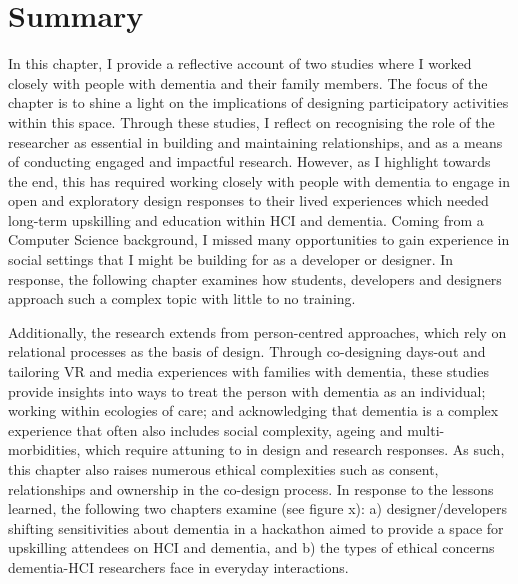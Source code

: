 \section{Summary}
\label{C4:Summary}
In this chapter, I provide a reflective account of two studies where I worked closely with people with dementia and their family members. The focus of the chapter is to shine a light on the implications of designing participatory activities within this space. Through these studies, I reflect on recognising the role of the researcher as essential in building and maintaining relationships, and as a means of conducting engaged and impactful research. However, as I highlight towards the end, this has required working closely with people with dementia to engage in open and exploratory design responses to their lived experiences which needed long-term upskilling and education within HCI and dementia. Coming from a Computer Science background, I missed many opportunities to gain experience in social settings that I might be building for as a developer or designer. In response, the following chapter examines how students, developers and designers approach such a complex topic with little to no training. 

Additionally, the research extends from person-centred approaches, which rely on relational processes as the basis of design. Through co-designing days-out and tailoring VR and media experiences with families with dementia, these studies provide insights into ways to treat the person with dementia as an individual; working within ecologies of care; and acknowledging that dementia is a complex experience that often also includes social complexity, ageing and multi-morbidities, which require attuning to in design and research responses. As such, this chapter also raises numerous ethical complexities such as consent, relationships and ownership in the co-design process. In response to the lessons learned, the following two chapters examine (see figure x): a) designer/developers shifting sensitivities about dementia in a hackathon aimed to provide a space for upskilling attendees on HCI and dementia, and b) the types of ethical concerns dementia-HCI researchers face in everyday interactions.






